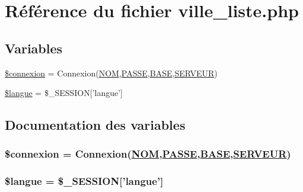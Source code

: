 \hypertarget{ville__liste_8php}{
\section{R\'{e}f\'{e}rence du fichier ville\_\-liste.php}
\label{ville__liste_8php}
}
\subsection*{Variables}
\begin{CompactItemize}
\item 
\hyperlink{ville__liste_8php_a0}{\$connexion} = Connexion(\hyperlink{pma__connect_8php_a0}{NOM},\hyperlink{pma__connect_8php_a1}{PASSE},\hyperlink{pma__connect_8php_a3}{BASE},\hyperlink{pma__connect_8php_a2}{SERVEUR})
\item 
\hyperlink{ville__liste_8php_a1}{\$langue} = \$\_\-SESSION\mbox{[}'langue'\mbox{]}
\end{CompactItemize}


\subsection{Documentation des variables}
\hypertarget{ville__liste_8php_a0}{
\subsubsection[\$connexion]{\setlength{\rightskip}{0pt plus 5cm}\$connexion = Connexion(\hyperlink{pma__connect_8php_a0}{NOM},\hyperlink{pma__connect_8php_a1}{PASSE},\hyperlink{pma__connect_8php_a3}{BASE},\hyperlink{pma__connect_8php_a2}{SERVEUR})}}
\label{ville__liste_8php_a0}


\hypertarget{ville__liste_8php_a1}{
\subsubsection[\$langue]{\setlength{\rightskip}{0pt plus 5cm}\$langue = \$\_\-SESSION\mbox{[}'langue'\mbox{]}}}
\label{ville__liste_8php_a1}


